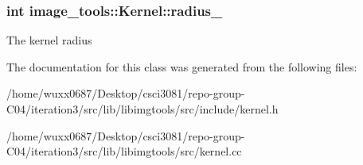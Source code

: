 \subsubsection[{\texorpdfstring{radius\+\_\+}{radius_}}]{\setlength{\rightskip}{0pt plus 5cm}int image\+\_\+tools\+::\+Kernel\+::radius\+\_\+\hspace{0.3cm}{\ttfamily [private]}}\hypertarget{classimage__tools_1_1Kernel_a75493a8e73d0217897d83da1ad30cc82}{}\label{classimage__tools_1_1Kernel_a75493a8e73d0217897d83da1ad30cc82}
The kernel radius 

The documentation for this class was generated from the following files\+:\begin{DoxyCompactItemize}
\item 
/home/wuxx0687/\+Desktop/csci3081/repo-\/group-\/\+C04/iteration3/src/lib/libimgtools/src/include/kernel.\+h\item 
/home/wuxx0687/\+Desktop/csci3081/repo-\/group-\/\+C04/iteration3/src/lib/libimgtools/src/kernel.\+cc\end{DoxyCompactItemize}
